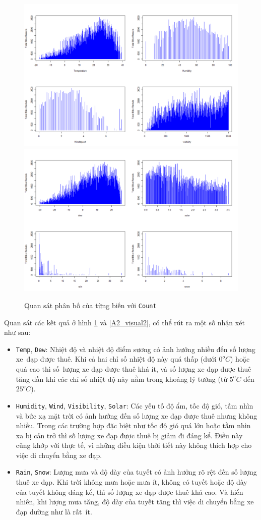 \begin{figure}[H]
	\centering
	{\includegraphics[width=.75\linewidth]{../Photo Of Result/A2_plotvar1}}\\
	{\includegraphics[width=.75\linewidth]{../Photo Of Result/A2_plotvar2}}
	\caption{Quan sát phân bố của từng biến với \texttt{Count}}
	\label{A2_visual1}
\end{figure}

Quan sát các kết quả ở hình \ref{A2_visual1} và \ref{A2_visual2}, có thể rút ra một số nhận xét như sau:
\begin{itemize}
	\item \texttt{Temp}, \texttt{Dew}: Nhiệt độ và nhiệt độ điểm sương có ảnh hưởng nhiều đến số lượng xe~đạp được thuê. Khi cả hai chỉ số nhiệt độ này quá thấp (dưới $0^oC$) hoặc quá cao thì số~lượng xe đạp được thuê khá ít, và số lượng xe đạp được thuê tăng dần khi các chỉ số nhiệt độ này nằm trong khoảng lý tưởng (từ $5^oC$ đến $25^oC$).
	\item \texttt{Humidity}, \texttt{Wind}, \texttt{Visibility}, \texttt{Solar}: Các yếu tố độ ẩm, tốc độ gió, tầm nhìn và bức xạ mặt trời có ảnh hưởng đến số lượng xe đạp được thuê nhưng không nhiều. Trong các trường hợp đặc biệt như tốc độ gió quá lớn hoặc tầm nhìn xa bị cản trở thì số lượng xe đạp được thuê bị giảm đi đáng kể. Điều này cũng khớp với thực tế, vì những điều kiện thời tiết này không thích hợp cho việc di chuyển bằng xe đạp.
	\item \texttt{Rain}, \texttt{Snow}: Lượng mưa và độ dày của tuyết có ảnh hưởng rõ rệt đến số lượng thuê xe đạp. Khi trời không mưa hoặc mưa ít, không có tuyết hoặc độ dày của tuyết không đáng kể, thì số lượng xe đạp được thuê khá cao. Và hiển nhiên, khi lượng mưa tăng, độ dày của tuyết tăng thì việc di chuyển bằng xe đạp dường như là rất~ít.
\end{itemize}


